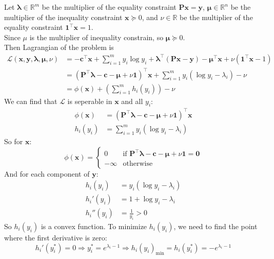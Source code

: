 Let $\pmb\lambda\in\mathbb{R}^m$ be the multiplier of the equality constraint $\pmb{Px}=\pmb y$, $\pmb\mu\in\mathbb{R}^n$ be the multiplier of the inequality constraint $\pmb x\succeq 0$, and $\nu\in\mathbb{R}$ be the multiplier of the equality constraint $\pmb 1^{\top}\pmb x=1$. \\
Since $\mu$ is the multiplier of inequality constrain, so $\pmb \mu\succeq 0$. \\
Then Lagrangian of the problem is
\begin{align*}
\mathcal{L}(\pmb x,\pmb  y,\pmb \lambda,\pmb \mu,\nu) &= -\pmb{c}^{\top} \pmb{x} + \sum_{i=1}^m y_i \log y_i+\pmb\lambda^{\top}(\pmb{Px}-\pmb y)-\pmb\mu^{\top}\pmb x+\nu(\pmb 1^{\top}\pmb x-1) \\
&= \left(\pmb P^{\top}\pmb \lambda - \pmb c - \pmb \mu + \nu\pmb 1\right)^{\top}\pmb x + \sum_{i=1}^m y_i \left(\log y_i - \lambda_i \right) - \nu \\
&= \phi(\pmb x) + \left(\sum_{i=1}^m h_i(y_i)\right) - \nu
\end{align*}
We can find that $\mathcal{L}$ is seperable in $\pmb x$ and all $y_i$:
\begin{align*}
\phi(\pmb x) &= \left(\pmb P^{\top}\pmb \lambda - \pmb c - \pmb \mu + \nu\pmb 1\right)^{\top}\pmb x \\
h_i(y_i) &= \sum_{i=1}^m y_i \left(\log y_i - \lambda_i \right)
\end{align*}
So for $\pmb x$:
$$\phi(\pmb x) = \begin{cases}
0 & \text{if } \pmb P^{\top}\pmb \lambda - \pmb c - \pmb \mu + \nu\pmb 1 = \pmb 0 \\
-\infty & \text{otherwise}
\end{cases}$$
And for each component of $\pmb y$:
\begin{align*}
h_i(y_i) &= y_i \left(\log y_i - \lambda_i\right) \\
h_i'(y_i) &= 1 + \log y_i - \lambda_i \\
h_i''(y_i) &= \frac{1}{y_i} > 0
\end{align*}
So $h_i(y_i)$ is a convex function. To minimize $h_i(y_i)$, we need to find the point where the first derivative is zero:
$$h_i'(y_i^*) = 0 \Rightarrow y_i^* = e^{\lambda_i-1} \Rightarrow h_i(y_i)_{\min} = h_i(y_i^*) = -e^{\lambda_i-1}$$

